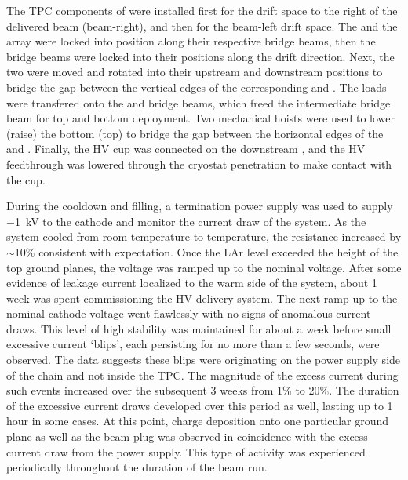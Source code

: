 The TPC components of  were installed first for the drift space to the right of the delivered beam (beam-right), and then for the beam-left drift space.
The  and the  array were locked into position along their respective bridge beams, then the bridge beams were locked into their positions along the drift direction.
Next, the two  were moved and rotated into their upstream and downstream positions to bridge the gap between the vertical edges of the corresponding  and .
The  loads were transfered onto the  and   bridge beams, which freed the intermediate bridge beam for top and bottom  deployment.
Two mechanical hoists were used to lower (raise) the bottom (top)  to bridge the gap between the horizontal edges of the  and .
Finally, the HV cup was connected on the downstream , and the HV feedthrough was lowered through the cryostat penetration to make contact with the cup.

During the cooldown and  filling, a  termination power supply was used to supply $-$\SI{1}{kV} to the cathode and monitor the current draw of the system.
As the system cooled from room temperature to  temperature, the resistance increased by $\sim$10\% consistent with expectation.
Once the LAr level exceeded the height of the top ground planes, the voltage was ramped up to the nominal voltage.
After some evidence of leakage current localized to the warm side of the system, about 1 week was spent commissioning the HV delivery system.
The next ramp up to the nominal cathode voltage went flawlessly with no signs of anomalous current draws.
This level of high stability was maintained for about a week before small excessive current `blips', each persisting for no more than a few seconds, were observed.
The data suggests these blips were originating on the power supply side of the chain and not inside the TPC.
The magnitude of the excess current during such events increased over the subsequent 3 weeks from 1\% to 20\%.
The duration of the excessive current draws developed over this period as well, lasting up to 1 hour in some cases.
At this point, charge deposition onto one particular ground plane as well as the beam plug was observed in coincidence with the excess current draw from the power supply.
This type of activity was experienced periodically throughout the duration of the  beam run.

